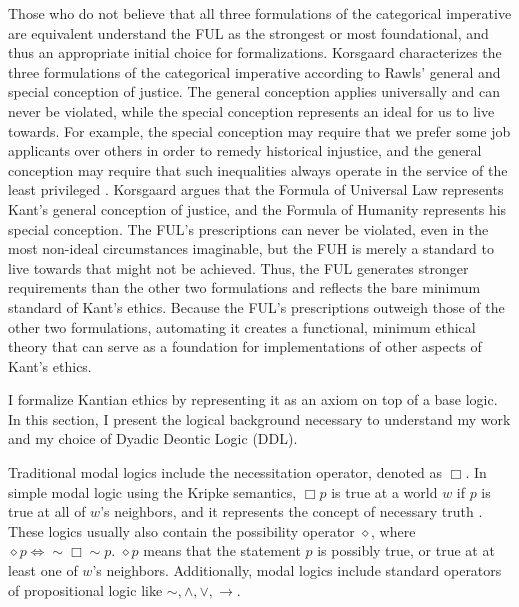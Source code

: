 \begin{isabellebody}
\begin{isamarkuptext}
Those who do not believe that all three formulations of the categorical imperative are equivalent
understand the FUL as the strongest or most foundational, and thus an appropriate initial choice for 
formalizations. Korsgaard characterizes the three formulations of the categorical
imperative according to Rawls' general and special conception of justice. The general conception applies
universally and can never be violated, while the special conception represents an ideal for us to
live towards. For example, the special conception may require that we prefer some job applicants
over others in order to remedy historical injustice, and the general conception may require that such
inequalities always operate in the service of the least privileged \citep[19]{KorsgaardRTL}. Korsgaard
argues that the Formula of Universal Law represents Kant's general conception of justice, and the Formula of 
Humanity represents his special conception. The FUL's prescriptions can never be violated, even in the most
non-ideal circumstances imaginable, but the FUH is merely a standard to live towards that might not be 
achieved. Thus, the FUL generates stronger requirements than the other two formulations and reflects 
the bare minimum standard of Kant's ethics. Because the FUL's prescriptions outweigh those of the other two formulations,
automating it creates a functional, minimum ethical theory that can serve as a foundation for implementations
of other aspects of Kant's ethics.%
\end{isamarkuptext}\isamarkuptrue%
%
\isadelimdocument
%
\endisadelimdocument
%
\isatagdocument
%
\isamarkuptrue%
%
\endisatagdocument
{\isafolddocument}%
%
\isadelimdocument
%
\endisadelimdocument
%
\begin{isamarkuptext}%
I formalize Kantian ethics by representing it as an axiom on top of a base logic. In this section, 
I present the logical background necessary to understand my work and my choice of Dyadic Deontic Logic (DDL).%
\end{isamarkuptext}\isamarkuptrue%
%
\begin{isamarkuptext}%
Traditional modal logics include the necessitation operator, denoted as $\Box$. In simple modal logic
using the Kripke semantics, $\Box p$ is true at a world $w$ if $p$ is true at all of $w$'s neighbors, 
and it represents the concept of necessary truth \citep{cresswell}. 
These logics usually also contain the possibility operator $\diamond$, where
 $\diamond p \iff \sim \Box \sim p$. $\diamond p$ means that the statement $p$ is possibly true, or true
at at least one of $w$'s neighbors. 
Additionally, modal logics include standard operators of propositional logic like $\sim, \wedge, \vee, \rightarrow$.


\end{isamarkuptext}
\end{isabellebody}
